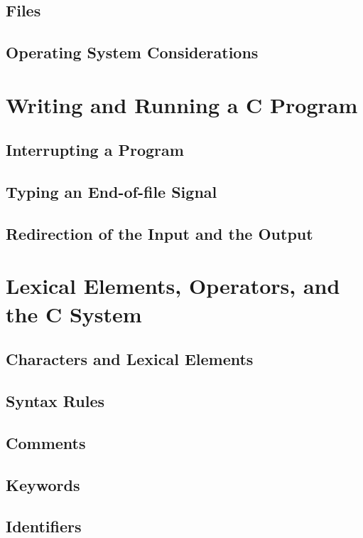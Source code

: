 \documentclass[12pt]{book}
\begin{document}
\section{Files} \label{sec:files}
\section{Operating System Considerations} \label{sec:os_considerations}

\chapter{Writing and Running a C Program}

\section{Interrupting a Program} \label{sec:interrupting_program}
\section{Typing an End-of-file Signal} \label{sec:end_of_file_signal}
\section{Redirection of the Input and the Output} \label{sec:redirection}

\chapter{Lexical Elements, Operators, and the C System}

\section{Characters and Lexical Elements} \label{sec:characters_lexical_elements}
\section{Syntax Rules} \label{sec:syntax_rules}
\section{Comments} \label{sec:comments}
\section{Keywords} \label{sec:keywords}
\section{Identifiers} \label{sec:identifiers}
\end{document}
